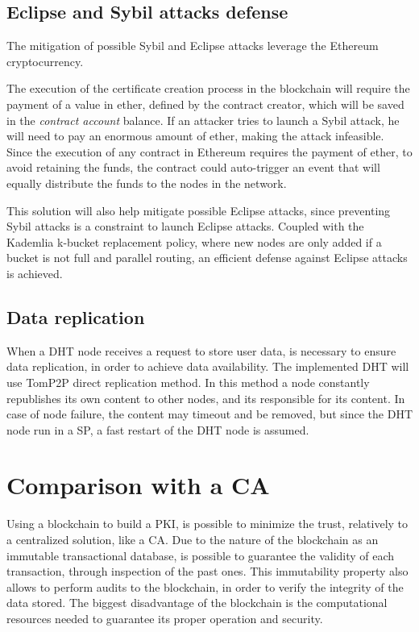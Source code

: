 \subsection{Eclipse and Sybil attacks defense}
The mitigation of possible Sybil and Eclipse attacks leverage the Ethereum cryptocurrency.

The execution of the certificate creation process in the blockchain will require the payment of a value in ether, defined by the contract creator, which will be saved in the \textit{contract account} balance.
If an attacker tries to launch a Sybil attack, he will need to pay an enormous amount of ether, making the attack infeasible.
Since the execution of any contract in Ethereum requires the payment of ether, to avoid retaining the funds, the contract could auto-trigger an event that will equally distribute the funds to the nodes in the network.

This solution will also help mitigate possible Eclipse attacks, since preventing Sybil attacks is a constraint to launch Eclipse attacks.
Coupled with the Kademlia k-bucket replacement policy, where new nodes are only added if a bucket is not full and parallel routing, an efficient defense against Eclipse attacks is achieved.

\subsection{Data replication}
When a DHT node receives a request to store user data, is necessary to ensure data replication, in order to achieve data availability.
The implemented DHT will use TomP2P direct replication method. In this method a node constantly republishes its own content to other nodes, and its responsible for its content.
In case of node failure, the content may timeout and be removed, but since the DHT node run in a SP, a fast restart of the DHT node is assumed.

\section{Comparison with a CA}
Using a blockchain to build a PKI, is possible to minimize the trust, relatively to a centralized solution, like a CA.
Due to the nature of the blockchain as an immutable transactional database, is possible to guarantee the validity of each transaction, through inspection of the past ones.
This immutability property also allows to perform audits to the blockchain, in order to verify the integrity of the data stored.
The biggest disadvantage of the blockchain is the computational resources needed to guarantee its proper operation and security.
